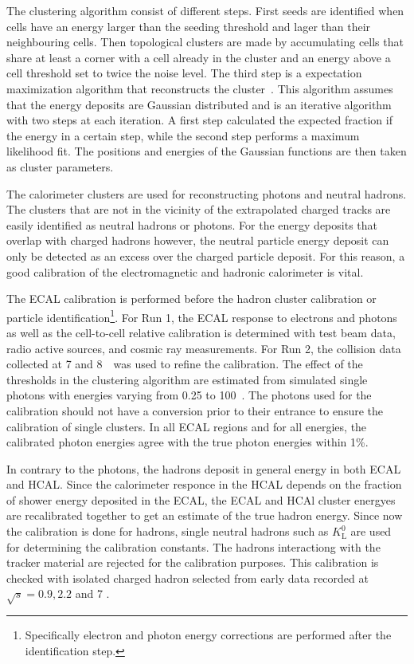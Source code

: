 The clustering algorithm consist of different steps. First seeds are identified when cells have an energy larger than the seeding threshold and lager than their neighbouring cells. Then topological clusters are made by accumulating cells that share at least a corner with a cell already in the cluster and an energy above a cell threshold set to twice the noise level. The third step is a expectation maximization algorithm that reconstructs the cluster~\cite{CMS-PRF-14-001}. This algorithm assumes that  the energy deposits are Gaussian distributed  and is an iterative algorithm with two steps at each iteration. A first step calculated the expected fraction if the energy in a certain step, while the second step performs a maximum likelihood fit. The positions and energies of the Gaussian functions are then taken as cluster parameters. 

The calorimeter clusters are used for reconstructing photons and neutral hadrons. The  clusters that are not in the vicinity of the extrapolated charged tracks are easily identified as neutral hadrons or photons. For the energy deposits that overlap with charged hadrons however, the neutral particle energy deposit can only be detected as an excess over the charged particle deposit. For this reason, a good calibration of the electromagnetic and hadronic calorimeter is  vital. 

The ECAL calibration is performed before the hadron cluster calibration or particle identification\footnote{Specifically electron and photon energy corrections are performed after the identification step.}. For Run 1, the ECAL response to electrons and photons as well as the cell-to-cell relative calibration is determined with test beam data, radio active sources, and cosmic ray measurements. For Run 2, the collision data collected at 7 and 8~\TeV\ was used to refine the calibration. The effect of the thresholds in the clustering algorithm are estimated from simulated single photons with energies varying from 0.25 to 100~\GeV. The photons used for the calibration should not have a conversion prior to their entrance to ensure the calibration of single clusters. In all ECAL regions and for all energies, the calibrated photon energies agree with the true photon energies within 1\%.

In contrary to the photons, the hadrons deposit in general energy in both ECAL and HCAL. Since the calorimeter responce in the HCAL depends on the fraction of shower energy deposited in the ECAL, the ECAL and HCAl cluster energyes are recalibrated together to get an estimate of the true hadron energy. Since now the calibration is done for hadrons, single neutral hadrons such as $K_{\mathrm{L}}^0$ are used for determining the calibration constants. The hadrons interactiong with the tracker material are rejected for the calibration purposes. This calibration is checked with isolated charged hadron selected from early data recorded at $\sqrt{s}=0.9, 2.2$ and 7 \TeV.  


